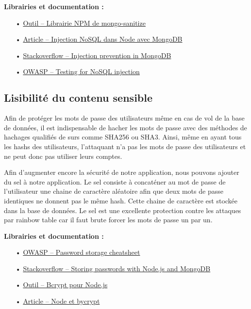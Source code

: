 \medskip
\textbf{Librairies et documentation :}

\begin{itemize}
\item[•] \href{https://www.npmjs.com/package/mongo-sanitize}{Outil -- Librairie NPM de mongo-sanitize}
\item[•] \href{https://zanon.io/posts/nosql-injection-in-mongodb}{Article -- Injection NoSQL dans Node avec MongoDB}
\item[•] \href{https://stackoverflow.com/questions/13436467/javascript-nosql-injection-prevention-in-mongodb}{Stackoverflow -- Injection prevention in MongoDB}
\item[•] \href{https://www.owasp.org/index.php/Testing_for_NoSQL_injection}{OWASP -- Testing for NoSQL injection}
\end{itemize}

\subsection{Lisibilité du contenu sensible}
\label{ssec:cm-hash}

Afin de protéger les mots de passe des utilisateurs même en cas de vol de la base de données, il est indispensable de hacher les mots de passe avec des méthodes de hachages qualifiés de surs comme SHA256 ou SHA3. Ainsi, même en ayant tous les hashs des utilisateurs, l'attaquant n'a pas les mots de passe des utilisateurs et ne peut donc pas utiliser leurs comptes.

Afin d'augmenter encore la sécurité de notre application, nous pouvons ajouter du sel à notre application. Le sel consiste à concaténer au mot de passe de l'utilisateur une chaine de caractère aléatoire afin que deux mots de passe identiques ne donnent pas le même hash. Cette chaine de caractère est stockée dans la base de données. Le sel est une excellente protection contre les attaques par rainbow table car il faut brute forcer les mots de passe un par un.
\clearpage

\medskip
\textbf{Librairies et documentation :}

\begin{itemize}
\item[•] \href{https://www.owasp.org/index.php/Password_Storage_Cheat_Sheet}{OWASP -- Password storage cheatsheet}
\item[•] \href{https://stackoverflow.com/questions/6951563/storing-passwords-with-node-js-and-mongodb}{Stackoverflow -- Storing passwords with Node.js and MongoDB}
\item[•] \href{https://github.com/kelektiv/node.bcrypt.js}{Outil -- Bcrypt pour Node.js}
\item[•] \href{https://www.abeautifulsite.net/hashing-passwords-with-nodejs-and-bcrypt}{Article -- Node et bycrypt}
\end{itemize}

